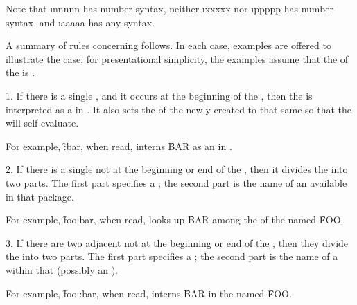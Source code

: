 Note that \i{nnnnn} has number syntax,
          neither \i{xxxxx} nor \i{ppppp} has number syntax,
      and \i{aaaaa} has any syntax.

A summary of rules concerning  follows.
In each case, examples are offered to illustrate the case;
for presentational simplicity, the examples assume that
the  of the  is .

\beginlist                                           
\item{1.}
If there is a single , and it occurs at the beginning of the
, then the  is interpreted as a  in .
It also sets the  of the newly-created  to that
same  so that the  will self-evaluate.

For example, 
\f{:bar}, when read, interns \f{BAR} as an  in .

\item{2.}
If there is a single  not at the beginning or end of the
, then it divides the  into two parts.  The first part
specifies a ; 
the second part is the name of an 
available in that package.  

For example, 
\f{foo:bar}, when read, looks up \f{BAR} among the  of
the  named \f{FOO}.

\item{3.}
If there are two adjacent  not at the beginning or end of the
, then they divide the  into two parts.  The first part
specifies a ;
the second part is the name of a  within
that  (possibly an ).

For example, 
\f{foo::bar}, when read, interns \f{BAR} in the  named \f{FOO}.

